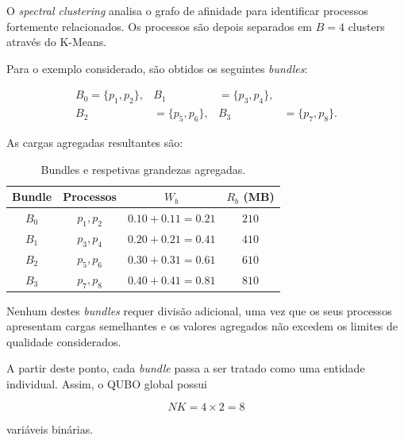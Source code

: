 O \textit{spectral clustering} analisa o grafo de afinidade para
identificar processos fortemente relacionados. Os processos são depois
separados em $B=4$ clusters através do K-Means.

Para o exemplo considerado, são obtidos os seguintes \textit{bundles}:

\begin{equation}
\begin{aligned}
    B_0 = \{p_1,p_2\}, &
    B_1 &= \{p_3,p_4\},\\
    B_2 &= \{p_5,p_6\}, &
    B_3 &= \{p_7,p_8\}.
\end{aligned}
\end{equation}

As cargas agregadas resultantes são:

\begin{table}[H]
\centering
\begin{tabular}{|c|c|c|c|}
\hline
\textbf{Bundle} & \textbf{Processos} &
\textbf{$W_b$} & \textbf{$R_b$ (MB)} \\
\hline
$B_0$ & $p_1,p_2$ & $0.10+0.11=0.21$ & $210$ \\
$B_1$ & $p_3,p_4$ & $0.20+0.21=0.41$ & $410$ \\
$B_2$ & $p_5,p_6$ & $0.30+0.31=0.61$ & $610$ \\
$B_3$ & $p_7,p_8$ & $0.40+0.41=0.81$ & $810$ \\
\hline
\end{tabular}
\caption{Bundles e respetivas grandezas agregadas.}
\label{tab:exemplo-bundles-formados}
\end{table}

Nenhum destes \textit{bundles} requer divisão adicional, uma vez que os
seus processos apresentam cargas semelhantes e os valores agregados não
excedem os limites de qualidade considerados.

A partir deste ponto, cada \textit{bundle} passa a ser tratado como uma
entidade individual. Assim, o QUBO global possui

\begin{equation}
    N K = 4 \times 2 = 8
\end{equation}

variáveis binárias.
